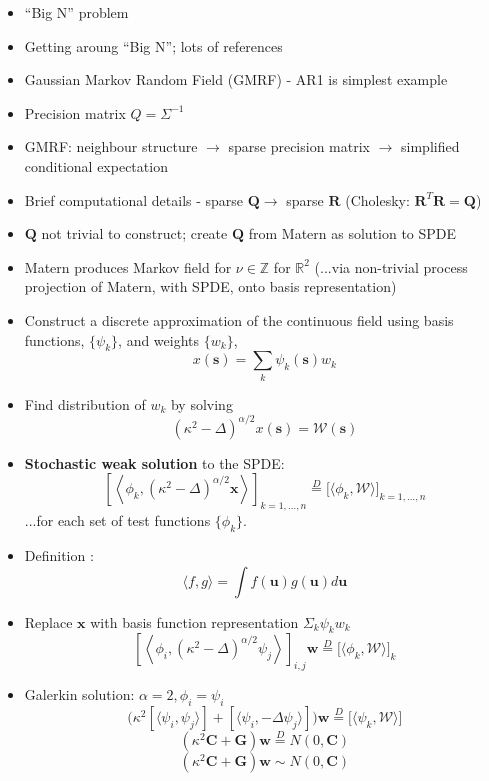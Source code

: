 \documentclass{article}
\begin{document}
\begin{itemize}
\item ``Big N'' problem
\item Getting aroung ``Big N''; lots of references
\item Gaussian Markov Random Field (GMRF) - AR1 is simplest example
\item Precision matrix $Q = \Sigma^{-1}$
\item GMRF: neighbour structure $\rightarrow$ sparse precision matrix $\rightarrow$ simplified conditional expectation
\item Brief computational details - sparse $\pmb{Q} \rightarrow$ sparse $\pmb{R}$ (Cholesky: $\pmb{R}^{T}\pmb{R} = \pmb{Q}$)
\item $\pmb{Q}$ not trivial to construct; create $\pmb{Q}$ from Matern as solution to SPDE 
\item Matern produces  Markov field for $\nu \in \mathbb{Z}$ for $\mathbb{R}^{2}$ (...via non-trivial process projection of Matern, with SPDE, onto basis representation)
\item Construct a discrete approximation of the continuous field using basis functions, $\{\psi_{k} \}$, and weights $\{ w_{k} \}$, 
$$ x(\pmb{s}) = \sum_{k} \psi_{k}(\pmb{s}) w_{k} $$
\item Find distribution of $w_{k}$ by solving 
$$ (\kappa^{2} - \Delta)^{\alpha/2}x(\pmb{s}) = \mathcal{W}(\pmb{s})$$
\item {\bf Stochastic weak solution} to the SPDE:
      $$ \left[ \left< \phi_{k}, (\kappa^{2} - \Delta)^{\alpha/2} \pmb{x} \right> \right]_{k = 1, \hdots, n} \overset{D}{=} \Big[ \langle \phi_{k}, \mathcal{W} \rangle \Big]_{k = 1, \hdots, n} $$
      ...for each set of test functions $\{\phi_{k}\}$.
\item Definition \citep{Lindgren2011}:
$$ \langle f, g \rangle = \int f(\pmb{u}) g(\pmb{u}) d\pmb{u} $$ 
\item Replace $\pmb{x}$ with basis function representation $\Sigma_{k}\psi_{k}w_{k}$
$$ \left[ \left< \phi_{i}, (\kappa^{2} - \Delta)^{\alpha/2} \psi_{j} \right> \right]_{i,j}\pmb{w} \overset{D}{=} \Big[ \langle \phi_{k}, \mathcal{W} \rangle \Big]_{k} $$
\item Galerkin solution: $\alpha = 2, \phi_{i} = \psi_{i}$
$$ \Big(
\kappa^{2} [ \langle \psi_{i}, \psi_{j} \rangle ] + [ \langle \psi_{i}, -\Delta \psi_{j} \rangle ]
\Big) \pmb{w} \overset{D}{=} \Big[ \langle \psi_{k}, \mathcal{W} \rangle \Big] $$
$$ \left(
\kappa^{2} \pmb{C} + \pmb{G} \right) \pmb{w} \overset{D}{=} N(0,\pmb{C}) $$
$$ \left(
\kappa^{2} \pmb{C} + \pmb{G} \right) \pmb{w} \sim N(0,\pmb{C}) $$


\end{itemize}
\end{document}
